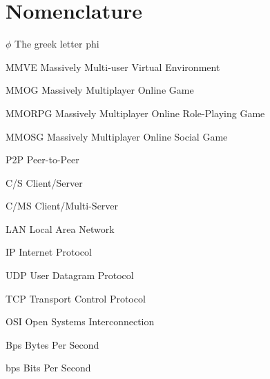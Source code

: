 \chapter{Nomenclature}

\newlength{\gnat}

\begin{Nomencl}[\gnat]

		\item[$\phi$]		The greek letter phi
		
		\item[MMVE]		Massively Multi-user Virtual Environment
        \item[MMOG]		Massively Multiplayer Online Game
        \item[MMORPG]   Massively Multiplayer Online Role-Playing Game
        \item[MMOSG]    Massively Multiplayer Online Social Game
        \item[P2P]      Peer-to-Peer
        \item[C/S]      Client/Server
        \item[C/MS]     Client/Multi-Server
        \item[LAN]      Local Area Network
        \item[IP]       Internet Protocol
        \item[UDP]      User Datagram Protocol
        \item[TCP]      Transport Control Protocol
        \item[OSI]      Open Systems Interconnection
        \item[Bps]      Bytes Per Second
        \item[bps]      Bits Per Second
\end{Nomencl}
\endinput
